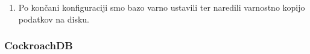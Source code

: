 \documentclass[a4paper, 12pt]{book}
\begin{document}
\begin{enumerate}
    \begin{listing}[H]
    \begin{verbatim}
        \c ycsb;
        SELECT * FROM master_add_node('<n1 ip addr>', 5432);
        SELECT * FROM master_add_node('<n2 ip addr>', 5432);
        SELECT create_distributed_table('usertable', 'ycsb_key');
    \end{verbatim}
    \label{code-ycsb-add-node-citus}
    \end{listing}
    \item Po končani konfiguraciji smo bazo varno ustavili ter naredili varnostno kopijo podatkov na disku.
\end{enumerate}

\subsubsection{CockroachDB}
\end{document}
